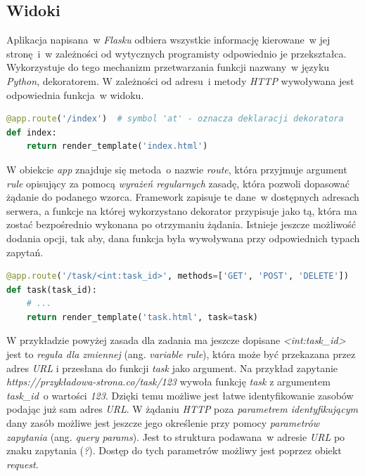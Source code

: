 \subsection{Widoki}
Aplikacja napisana~w \textit{Flasku} odbiera wszystkie informację kierowane~w jej stronę~i~w zależności od wytycznych programisty odpowiednio je przekształca. Wykorzystuje do tego mechanizm przetwarzania funkcji nazwany~w języku \textit{Python}, dekoratorem\cite{python}. W zależności od adresu~i metody \textit{HTTP} wywoływana jest odpowiednia funkcja~w widoku.
\begin{lstlisting}[language=Python, caption={Dekorator \textit{@app.route('\/index')} zastosowany na funkcji index.}]
@app.route('/index')  # symbol 'at' - oznacza deklaracji dekoratora
def index:
	return render_template('index.html')
\end{lstlisting}
W obiekcie \textit{app} znajduje się metoda~o nazwie \textit{route}, która przyjmuje argument \textit{rule} opisujący za pomocą \textit{wyrażeń regularnych}\cite{python,flask} zasadę, która pozwoli dopasować żądanie do podanego wzorca. Framework zapisuje te dane~w dostępnych adresach serwera, a funkcje na której wykorzystano dekorator przypisuje jako tą, która ma zostać bezpośrednio wykonana po otrzymaniu żądania. Istnieje jeszcze możliwość dodania opcji, tak aby, dana funkcja była wywoływana przy odpowiednich typach zapytań.
\begin{lstlisting}[language=Python, caption={Dekorator \textit{@app.route} z dodatkową opcja \textit{methods}.}]
@app.route('/task/<int:task_id>', methods=['GET', 'POST', 'DELETE'])
def task(task_id):
	# ...
	return render_template('task.html', task=task)
\end{lstlisting}
W przykładzie powyżej zasada dla zadania ma jeszcze dopisane \textit{<int:task\_id>} jest to \textit{reguła dla zmiennej} (ang. \textit{variable rule}\cite{flask}), która może być przekazana przez adres \textit{URL} i przesłana do funkcji \textit{task} jako argument. Na przykład zapytanie \textit{https://przykładowa-strona.co/task/123} wywoła funkcję \textit{task} z argumentem \textit{task\_id}~o wartości \textit{123}. Dzięki temu możliwe jest łatwe identyfikowanie zasobów podając już sam adres \textit{URL}. 
W żądaniu \textit{HTTP} poza \textit{parametrem identyfikującym} dany zasób możliwe jest jeszcze jego określenie przy pomocy \textit{parametrów zapytania} (ang. \textit{query params}). Jest to struktura podawana~w adresie \textit{URL} po znaku zapytania (\textit{?}). Dostęp do tych parametrów możliwy jest poprzez obiekt \textit{request}\cite{flask}.
